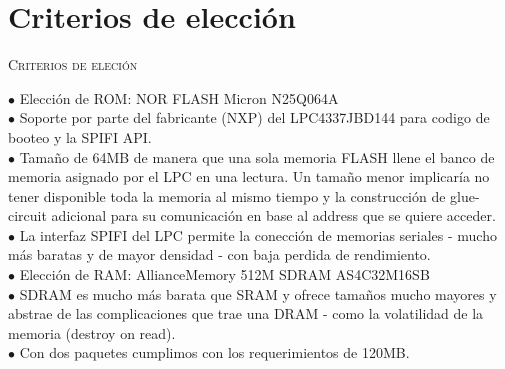 \documentclass[12pt,a4paper]{report}
\makeatletter
\newcommand{\unchapter}[1]{%
  \begingroup
  \let\@makechapterhead\@gobble %
  \chapter{#1}
  \endgroup
}
\makeatother
\begin{document}
\newpage
\unchapter{Criterios de elección}
{\center \large \scshape Criterios de eleción}\\ 
\begin{flushleft}
 \hspace{1cm}$\bullet$ Elección de ROM: NOR FLASH Micron N25Q064A\\
\hspace{2cm}$\bullet$ Soporte por parte del fabricante (NXP) del LPC4337JBD144 para codigo de booteo y la SPIFI API.\\
\hspace{2cm}$\bullet$ Tamaño de 64MB de manera que una sola memoria FLASH llene el banco de memoria asignado por el LPC en una lectura. Un tamaño menor implicaría no tener disponible toda la memoria al mismo tiempo y la construcción de glue-circuit adicional para su comunicación en base al address que se quiere acceder.\\
\hspace{2cm}$\bullet$ La interfaz SPIFI del LPC permite la conección de memorias seriales - mucho más baratas y de mayor densidad - con baja perdida de rendimiento. \\

 \hspace{1cm}$\bullet$ Elección de RAM: AllianceMemory 512M SDRAM AS4C32M16SB\\
\hspace{2cm}$\bullet$ SDRAM es mucho más barata que SRAM y ofrece tamaños mucho mayores y abstrae de las complicaciones que trae una DRAM - como la volatilidad de la memoria (destroy on read).\\
\hspace{2cm}$\bullet$ Con dos paquetes cumplimos con los requerimientos de 120MB. 
	
\end{flushleft}
\end{document}

